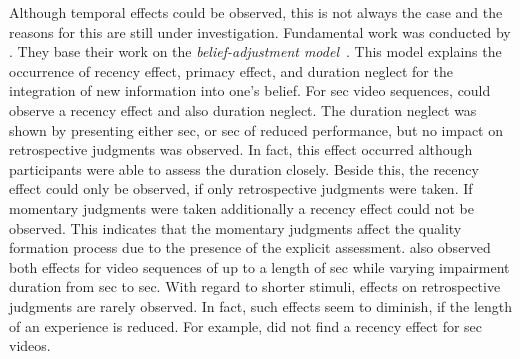 Although temporal effects could be observed, this is not always the case and the reasons for this are still under investigation.
Fundamental work was conducted by \citet{hands_recency_2001}.
They base their work on the \emph{belief-adjustment model}~\citep{hogarth_order_1992}.
This model explains the occurrence of recency effect, primacy effect, and duration neglect for the integration of new information into one's belief. %
For \unit[30]{sec} video sequences, \citet{hands_recency_2001} could observe a recency effect and also duration neglect.
The duration neglect was shown by presenting either \unit[5]{sec}, or \unit[10]{sec} of reduced performance, but no impact on retrospective judgments was observed.
In fact, this effect occurred although participants were able to assess the duration closely. %
Beside this, the recency effect could only be observed, if only retrospective judgments were taken.
If momentary judgments were taken additionally a recency effect could not be observed.
This indicates that the momentary judgments affect the quality formation process due to the presence of the explicit assessment.
\citet{hamberg_time-varying_1999} also observed both effects for video sequences of up to a length of \unit[180]{sec} while varying impairment duration from \unit[2]{sec} to \unit[10]{sec}.
With regard to shorter stimuli, effects on retrospective judgments are rarely observed.
In fact, such effects seem to diminish, if the length of an experience is reduced.
For example, \citet{ninassi_considering_2009} did not find a recency effect for \unit[8]{sec} videos.

